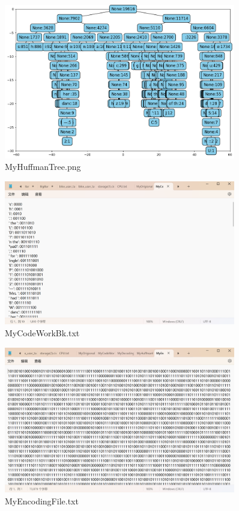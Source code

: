 \documentclass[12pt]{article}
\begin{document}
\begin{figure}[htbp]
    \centering
    \includegraphics[width=0.9\textwidth]{MyHuffmanTree.png}
    \caption{MyHuffmanTree.png}
    \label{pic4}
\end{figure}

\begin{figure}[htbp]
    \centering
    \includegraphics[width=0.9\textwidth]{dic.png}
    \caption{MyCodeWorkBk.txt}
    \label{pic5}
\end{figure}

\begin{figure}[htbp]
    \centering
    \includegraphics[width=0.9\textwidth]{encode.png}
    \caption{MyEncodingFile.txt}
    \label{pic6}
\end{figure}
\end{document}
